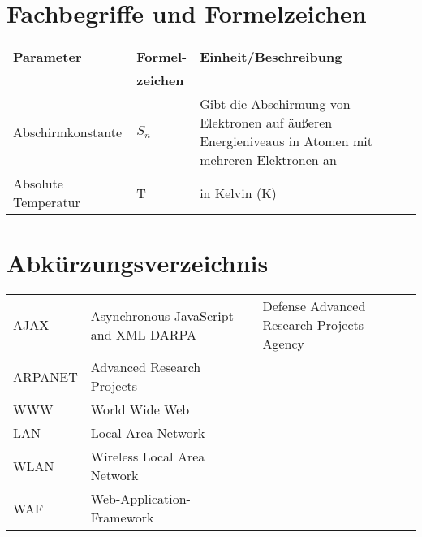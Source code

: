 \section*{Fachbegriffe und Formelzeichen}
\begin{longtable}{llp{6.5cm}}
	\textbf{Parameter} & \textbf{Formel-} & \textbf{Einheit/Beschreibung}\\
	 & \textbf{zeichen} & \\
	Abschirmkonstante & $ S_n $ & Gibt die Abschirmung von Elektronen auf äußeren Energieniveaus in Atomen mit mehreren Elektronen an\\
	Absolute Temperatur & T & in Kelvin (K)\\ 
\end{longtable}

\vspace{1cm}


\section*{Abkürzungsverzeichnis}

\begin{tabularx}{0.9\columnwidth}{lX}
	AJAX & Asynchronous JavaScript and XML
	DARPA & Defense Advanced Research Projects Agency\\
	ARPANET & Advanced Research Projects\\
	WWW & World Wide Web \\
	LAN & Local Area Network \\
	WLAN & Wireless Local Area Network \\
	WAF & Web-Application-Framework \\
\end{tabularx}



	
%
